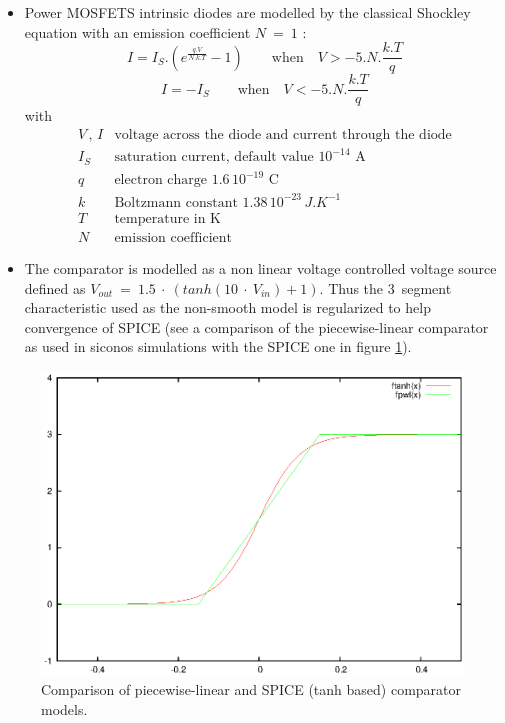 \begin{itemize}
\item Power MOSFETS intrinsic diodes are modelled by the classical Shockley equation with an emission
coefficient $N~=~1$ :
\[ I = I_S.({e^{\frac{q.V}{N.k.T}} - 1}) \qquad \textrm{when} \quad V > -5.N.\frac{k.T}{q} \]
\[ I = -I_S \qquad  \textrm{when} \quad V < -5.N.\frac{k.T}{q} \]
with
\[
\begin{array}{ll}
V\,,\,I & \textrm{voltage across the diode and current through the diode}\\
I_S & \textrm{saturation current, default value $10^{-14}$~A}\\
q & \textrm{electron charge $1.6\,10^{-19}$~C}\\
k & \textrm{Boltzmann constant $1.38\,10^{-23}\,J.K^{-1}$}\\
T & \textrm{temperature in K}\\
N & \textrm{emission coefficient}
\end{array}
\]
\item The comparator is modelled as a non linear voltage controlled voltage source defined as $V_{out}~=~1.5~\cdot~(tanh(10~\cdot~V_{in}) + 1)$. Thus the 3~segment characteristic used as the non-smooth model is regularized to help convergence of SPICE
(see a comparison of the piecewise-linear comparator as used in {\sc siconos} simulations with the SPICE one in figure \ref{fig-comparator-models}).
\end{itemize}

\begin{figure}[hbtp]
\begin{center}
\includegraphics[scale=0.6,angle=0]{./figure/comparators.eps}
\end{center}
\caption{Comparison of piecewise-linear and SPICE (tanh based) comparator models.}
\label{fig-comparator-models}
\end{figure}



